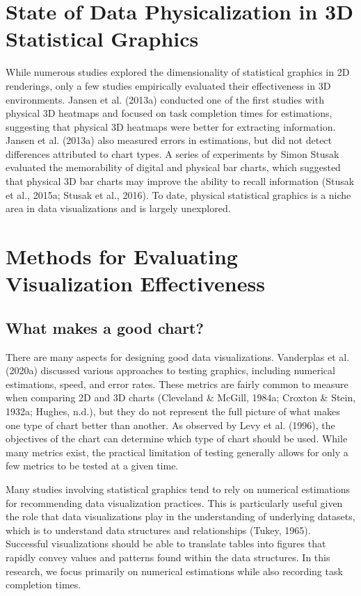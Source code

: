 \documentclass[phd]{nuthesis}
\begin{document}
\section{State of Data Physicalization in 3D Statistical
Graphics}\label{state-of-data-physicalization-in-3d-statistical-graphics}

While numerous studies explored the dimensionality of statistical
graphics in 2D renderings, only a few studies empirically evaluated
their effectiveness in 3D environments. Jansen et al. (2013a) conducted
one of the first studies with physical 3D heatmaps and focused on task
completion times for estimations, suggesting that physical 3D heatmaps
were better for extracting information. Jansen et al. (2013a) also
measured errors in estimations, but did not detect differences
attributed to chart types. A series of experiments by Simon Stusak
evaluated the memorability of digital and physical bar charts, which
suggested that physical 3D bar charts may improve the ability to recall
information (Stusak et al., 2015a; Stusak et al., 2016). To date,
physical statistical graphics is a niche area in data visualizations and
is largely unexplored.

\section{Methods for Evaluating Visualization
Effectiveness}\label{methods-for-evaluating-visualization-effectiveness}

\subsection{What makes a good chart?}\label{what-makes-a-good-chart}

There are many aspects for designing good data visualizations.
Vanderplas et al. (2020a) discussed various approaches to testing
graphics, including numerical estimations, speed, and error rates. These
metrics are fairly common to measure when comparing 2D and 3D charts
(Cleveland \& McGill, 1984a; Croxton \& Stein, 1932a; Hughes, n.d.), but
they do not represent the full picture of what makes one type of chart
better than another. As observed by Levy et al. (1996), the objectives
of the chart can determine which type of chart should be used. While
many metrics exist, the practical limitation of testing generally allows
for only a few metrics to be tested at a given time.

Many studies involving statistical graphics tend to rely on numerical
estimations for recommending data visualization practices. This is
particularly useful given the role that data visualizations play in the
understanding of underlying datasets, which is to understand data
structures and relationships (Tukey, 1965). Successful visualizations
should be able to translate tables into figures that rapidly convey
values and patterns found within the data structures. In this research,
we focus primarily on numerical estimations while also recording task
completion times.
\end{document}
